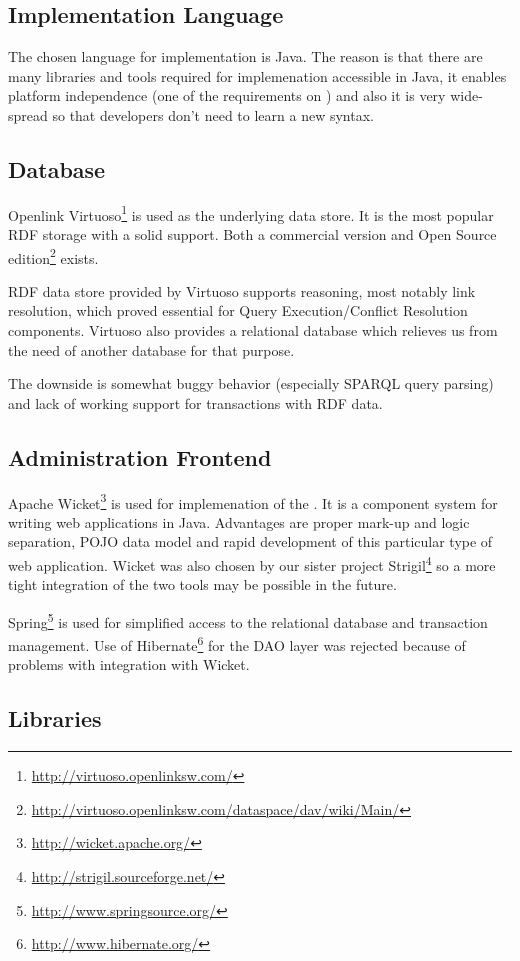 \subsection{Implementation Language}
The chosen language for implementation is Java. The reason is that there are many libraries and tools required for implemenation accessible in Java, it enables platform independence (one of the requirements on \odcs) and also it is very wide-spread so that developers don't need to learn a new syntax.

\subsection{Database}
Openlink Virtuoso\footnote{\url{http://virtuoso.openlinksw.com/}} is used as the underlying data store. It is the most popular RDF storage with a solid support. Both a commercial version and Open Source edition\footnote{\url{http://virtuoso.openlinksw.com/dataspace/dav/wiki/Main/}} exists.

RDF data store provided by Virtuoso supports reasoning, most notably  link resolution, which proved essential for Query Execution/Conflict Resolution components. Virtuoso also provides a relational database which relieves us from the need of another database for that purpose.

The downside is somewhat buggy behavior (especially SPARQL query parsing) and lack of working support for transactions with RDF data.

\subsection{Administration Frontend}
Apache Wicket\footnote{\url{http://wicket.apache.org/}} is used for implemenation of the \FE. It is a component system for writing web applications in Java. Advantages are proper mark-up and logic separation, POJO data model and rapid development of this particular type of web application. Wicket was also chosen by our sister project Strigil\footnote{\url{http://strigil.sourceforge.net/}} so a more tight integration of the two tools may be possible in the future.

Spring\footnote{\url{http://www.springsource.org/}} is used for simplified access to the relational database and transaction management. Use of Hibernate\footnote{\url{http://www.hibernate.org/}} for the DAO layer was rejected because of problems with integration with Wicket.

\subsection{Libraries}
